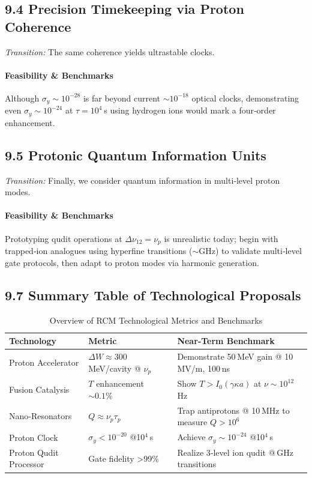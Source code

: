 \subsection{9.4 Precision Timekeeping via Proton Coherence}
\emph{Transition:} The same coherence yields ultrastable clocks.

\paragraph{Feasibility \& Benchmarks}  
Although \(\sigma_y\sim10^{-28}\) is far beyond current \(\sim10^{-18}\) optical clocks, demonstrating even \(\sigma_y\sim10^{-24}\) at \(\tau=10^4\) s using hydrogen ions would mark a four‐order enhancement.

\subsection{9.5 Protonic Quantum Information Units}
\emph{Transition:} Finally, we consider quantum information in multi‐level proton modes.

\paragraph{Feasibility \& Benchmarks}  
Prototyping qudit operations at \(\Delta\nu_{12}=\nu_p\) is unrealistic today; begin with trapped‐ion analogues using hyperfine transitions (\(\sim\)GHz) to validate multi‐level gate protocols, then adapt to proton modes via harmonic generation.


\subsection{9.7 Summary Table of Technological Proposals}
\begin{table}[ht]
  \centering
  \caption{Overview of RCM Technological Metrics and Benchmarks}
  \label{tab:tech_summary}
  \begin{tabular}{@{}lll@{}}
    \toprule
    Technology               & Metric & Near‐Term Benchmark \\
    \midrule
    Proton Accelerator       & \(\Delta W\approx300\) MeV/cavity @ \(\nu_p\) & Demonstrate 50 MeV gain @ 10 MV/m, 100 ns \\
    Fusion Catalysis         & \(T\) enhancement \(\sim0.1\%\) & Show \(T>I_0(\gamma\kappa a)\) at \(\nu\sim10^{12}\) Hz \\
    Nano‐Resonators          & \(Q\approx\nu_p\tau_p\) & Trap antiprotons @ 10 MHz to measure \(Q>10^6\) \\
    Proton Clock             & \(\sigma_y<10^{-20}\) @10\(^4\) s & Achieve \(\sigma_y\sim10^{-24}\) @10\(^4\) s \\
    Proton Qudit Processor   & Gate fidelity >99\% & Realize 3‐level ion qudit @ GHz transitions \\
    \bottomrule
  \end{tabular}
\end{table}


